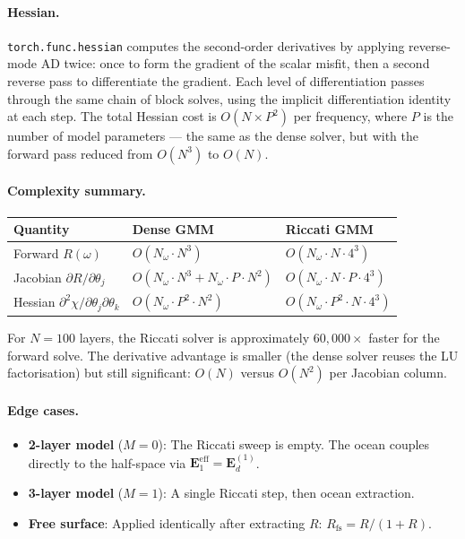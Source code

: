 \documentclass[11pt,a4paper]{article}
\theoremstyle{plain}
\theoremstyle{remark}
\begin{document}
\paragraph{Hessian.}
\texttt{torch.func.hessian} computes the second-order derivatives by
applying reverse-mode AD twice: once to form the gradient of the scalar
misfit, then a second reverse pass to differentiate the gradient.  Each
level of differentiation passes through the same chain of block solves,
using the implicit differentiation identity at each step.  The total
Hessian cost is $O(N \times P^2)$ per frequency, where $P$ is the number
of model parameters --- the same as the dense solver, but with the
forward pass reduced from $O(N^3)$ to $O(N)$.

\paragraph{Complexity summary.}
\begin{center}
\renewcommand{\arraystretch}{1.3}
\begin{tabular}{lll}
  \toprule
  \textbf{Quantity}
    & \textbf{Dense GMM}
    & \textbf{Riccati GMM} \\
  \midrule
  Forward $R(\omega)$
    & $O(N_\omega \cdot N^3)$
    & $O(N_\omega \cdot N \cdot 4^3)$ \\
  Jacobian $\partial R/\partial\theta_j$
    & $O(N_\omega \cdot N^3 + N_\omega \cdot P \cdot N^2)$
    & $O(N_\omega \cdot N \cdot P \cdot 4^3)$ \\
  Hessian $\partial^2\chi/\partial\theta_j\partial\theta_k$
    & $O(N_\omega \cdot P^2 \cdot N^2)$
    & $O(N_\omega \cdot P^2 \cdot N \cdot 4^3)$ \\
  \bottomrule
\end{tabular}
\end{center}

\noindent For $N = 100$ layers, the Riccati solver is approximately
$60{,}000\times$ faster for the forward solve.  The derivative advantage
is smaller (the dense solver reuses the LU factorisation) but still
significant: $O(N)$ versus $O(N^2)$ per Jacobian column.

\paragraph{Edge cases.}
\begin{itemize}[nosep]
\item \textbf{2-layer model} ($M = 0$): The Riccati sweep is empty.
  The ocean couples directly to the half-space via
  $\mathbf{E}_1^{\text{eff}} = \mathbf{E}_d^{(1)}$.
\item \textbf{3-layer model} ($M = 1$): A single Riccati step, then
  ocean extraction.
\item \textbf{Free surface}: Applied identically after extracting $R$:
  $R_{\text{fs}} = R/(1 + R)$.
\end{itemize}
\end{document}
